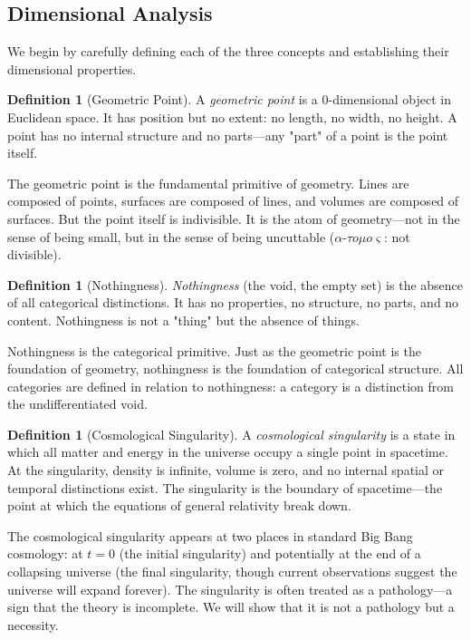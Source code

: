 \documentclass[12pt,a4paper]{article}
\theoremstyle{definition}
\newtheorem{definition}[theorem]{Definition}
\theoremstyle{remark}
\begin{document}
\subsection{Dimensional Analysis}

We begin by carefully defining each of the three concepts and establishing their dimensional properties.

\begin{definition}[Geometric Point]
\label{def:point}
A \emph{geometric point} is a 0-dimensional object in Euclidean space. It has position but no extent: no length, no width, no height. A point has no internal structure and no parts—any "part" of a point is the point itself.
\end{definition}

The geometric point is the fundamental primitive of geometry. Lines are composed of points, surfaces are composed of lines, and volumes are composed of surfaces. But the point itself is indivisible. It is the atom of geometry—not in the sense of being small, but in the sense of being uncuttable ($\alpha$-$\tau o \mu o \varsigma$: not divisible).

\begin{definition}[Nothingness]
\label{def:nothing}
\emph{Nothingness} (the void, the empty set) is the absence of all categorical distinctions. It has no properties, no structure, no parts, and no content. Nothingness is not a "thing" but the absence of things.
\end{definition}

Nothingness is the categorical primitive. Just as the geometric point is the foundation of geometry, nothingness is the foundation of categorical structure. All categories are defined in relation to nothingness: a category is a distinction from the undifferentiated void.

\begin{definition}[Cosmological Singularity]
\label{def:singularity}
A \emph{cosmological singularity} is a state in which all matter and energy in the universe occupy a single point in spacetime. At the singularity, density is infinite, volume is zero, and no internal spatial or temporal distinctions exist. The singularity is the boundary of spacetime—the point at which the equations of general relativity break down.
\end{definition}

The cosmological singularity appears at two places in standard Big Bang cosmology: at $t = 0$ (the initial singularity) and potentially at the end of a collapsing universe (the final singularity, though current observations suggest the universe will expand forever). The singularity is often treated as a pathology—a sign that the theory is incomplete. We will show that it is not a pathology but a necessity.
\end{document}
